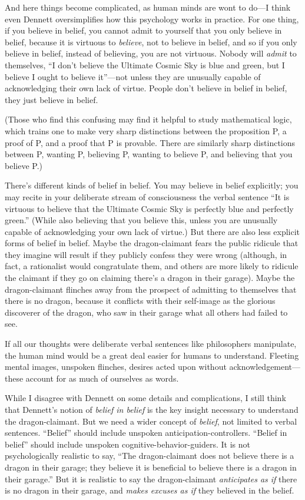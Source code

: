 {
 And here things become complicated, as human minds are wont to
do---I think even Dennett oversimplifies how this psychology works in
practice. For one thing, if you believe in belief, you cannot admit to
yourself that you only believe in belief, because it is virtuous to
\textit{believe}, not to believe in belief, and so if you only believe
in belief, instead of believing, you are not virtuous. Nobody will
\textit{admit} to themselves, ``I
don't believe the Ultimate Cosmic Sky is blue and
green, but I believe I ought to believe it''---not
unless they are unusually capable of acknowledging their own lack of
virtue. People don't believe in belief in belief, they
just believe in belief.}

{
 (Those who find this confusing may find it helpful to study
mathematical logic, which trains one to make very sharp distinctions
between the proposition P, a proof of P, and a proof that P is
provable. There are similarly sharp distinctions between P, wanting P,
believing P, wanting to believe P, and believing that you believe P.)}

{
 There's different kinds of belief in belief. You
may believe in belief explicitly; you may recite in your deliberate
stream of consciousness the verbal sentence ``It is
virtuous to believe that the Ultimate Cosmic Sky is perfectly blue and
perfectly green.'' (While also believing that you
believe this, unless you are unusually capable of acknowledging your
own lack of virtue.) But there are also less explicit forms of belief
in belief. Maybe the dragon-claimant fears the public ridicule that
they imagine will result if they publicly confess they were wrong
(although, in fact, a rationalist would congratulate them, and others
are more likely to ridicule the claimant if they go on claiming
there's a dragon in their garage). Maybe the
dragon-claimant flinches away from the prospect of admitting to
themselves that there is no dragon, because it conflicts with their
self-image as the glorious discoverer of the dragon, who saw in their
garage what all others had failed to see.}

{
 If all our thoughts were deliberate verbal sentences like
philosophers manipulate, the human mind would be a great deal easier
for humans to understand. Fleeting mental images, unspoken flinches,
desires acted upon without acknowledgement---these account for as much
of ourselves as words.}

{
 While I disagree with Dennett on some details and complications, I
still think that Dennett's notion of \textit{belief in
belief} is the key insight necessary to understand the dragon-claimant.
But we need a wider concept of \textit{belief}, not limited to verbal
sentences. ``Belief'' should include
unspoken anticipation-controllers. ``Belief in
belief'' should include unspoken
cognitive-behavior-guiders. It is not psychologically realistic to say,
``The dragon-claimant does not believe there is a
dragon in their garage; they believe it is beneficial to believe there
is a dragon in their garage.'' But it is realistic to
say the dragon-claimant \textit{anticipates as if} there is no dragon
in their garage, and \textit{makes excuses as if} they believed in the
belief.}

